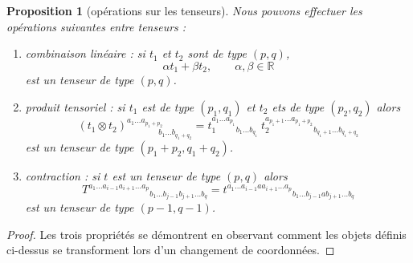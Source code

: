 \documentclass[a4paper,11pt]{report}
\theoremstyle{definition}
\theoremstyle{plain}
\newtheorem{prop}[thm]{Proposition}
\theoremstyle{definition}
\theoremstyle{remark}
\begin{document}
                \begin{prop}[opérations sur les tenseurs]
                    Nous pouvons effectuer les opérations suivantes entre tenseurs :
                    \begin{enumerate}[label = \textit{\roman*)}]
                        \item combinaison linéaire : si $t_1$ et $t_2$ sont de type $(p,q)$,
                        \begin{equation}
                            \alpha t_1 + \beta t_2, \qquad\alpha,\beta\in\mathbb{R}
                        \end{equation} 
                        est un tenseur de type $(p,q)$.
                        \item produit tensoriel : si $t_1$ est de type $(p_1,q_1)$ et $t_2$ ets de type $(p_2,q_2)$ alors
                        \begin{equation}
                            (t_1\otimes t_2)_{\qquad\qquad b_1\dots b_{q_1+q_2}}^{a_1\dots a_{p_1+p_2}} =
                            t_1^{a_1\dots a_{p_1}}{}_{b_1\dots b_{q_1}}~t_2^{a_{p_1+1}\dots a_{p_1+p_2}}{}_{b_{q_1+1}\dots b_{q_1+q_2}}
                        \end{equation}
                        est un tenseur de type $(p_1+p_2,q_1+q_2)$.
                        \item contraction : si $t$ est un tenseur de type $(p,q)$ alors
                        \begin{equation}
                            T^{a_1\dots a_{i-1}a_{i+1}\dots a_p}{}_{b_1\dots b_{j-1}b_{j+1}\dots b_q} = t^{a_1\dots a_{i-1} a a_{i+1}\dots a_p}{}_{b_1\dots b_{j-1} a b_{j+1}\dots b_q}
                        \end{equation}
                        est un tenseur de type $(p-1,q-1)$.
                    \end{enumerate}
                \end{prop}
                
                \begin{proof}
                    Les trois propriétés se démontrent en observant comment les objets définis ci-dessus se transforment lors d'un changement de coordonnées.
                \end{proof}
                
\end{document}
